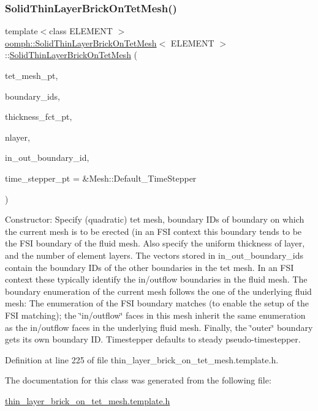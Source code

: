 \subsubsection{\texorpdfstring{Solid\+Thin\+Layer\+Brick\+On\+Tet\+Mesh()}{SolidThinLayerBrickOnTetMesh()}}
{\footnotesize\ttfamily template$<$class E\+L\+E\+M\+E\+NT $>$ \\
\hyperlink{classoomph_1_1SolidThinLayerBrickOnTetMesh}{oomph\+::\+Solid\+Thin\+Layer\+Brick\+On\+Tet\+Mesh}$<$ E\+L\+E\+M\+E\+NT $>$\+::\hyperlink{classoomph_1_1SolidThinLayerBrickOnTetMesh}{Solid\+Thin\+Layer\+Brick\+On\+Tet\+Mesh} (\begin{DoxyParamCaption}\item[{Mesh $\ast$}]{tet\+\_\+mesh\+\_\+pt,  }\item[{const Vector$<$ unsigned $>$ \&}]{boundary\+\_\+ids,  }\item[{\hyperlink{classoomph_1_1SolidThinLayerBrickOnTetMesh_ae4289650b0c0eccb2fd3d661b85e85ee}{Thickness\+Fct\+Pt}}]{thickness\+\_\+fct\+\_\+pt,  }\item[{const unsigned \&}]{nlayer,  }\item[{const Vector$<$ Vector$<$ unsigned $>$ $>$ \&}]{in\+\_\+out\+\_\+boundary\+\_\+id,  }\item[{Time\+Stepper $\ast$}]{time\+\_\+stepper\+\_\+pt = {\ttfamily \&Mesh\+:\+:Default\+\_\+TimeStepper} }\end{DoxyParamCaption})\hspace{0.3cm}{\ttfamily [inline]}}



Constructor\+: Specify (quadratic) tet mesh, boundary I\+Ds of boundary on which the current mesh is to be erected (in an F\+SI context this boundary tends to be the F\+SI boundary of the fluid mesh. Also specify the uniform thickness of layer, and the number of element layers. The vectors stored in in\+\_\+out\+\_\+boundary\+\_\+ids contain the boundary I\+Ds of the other boundaries in the tet mesh. In an F\+SI context these typically identify the in/outflow boundaries in the fluid mesh. The boundary enumeration of the current mesh follows the one of the underlying fluid mesh\+: The enumeration of the F\+SI boundary matches (to enable the setup of the F\+SI matching); the \char`\"{}in/outflow\char`\"{} faces in this mesh inherit the same enumeration as the in/outflow faces in the underlying fluid mesh. Finally, the \char`\"{}outer\char`\"{} boundary gets its own boundary ID. Timestepper defaults to steady pseudo-\/timestepper. 



Definition at line 225 of file thin\+\_\+layer\+\_\+brick\+\_\+on\+\_\+tet\+\_\+mesh.\+template.\+h.



The documentation for this class was generated from the following file\+:\begin{DoxyCompactItemize}
\item 
\hyperlink{thin__layer__brick__on__tet__mesh_8template_8h}{thin\+\_\+layer\+\_\+brick\+\_\+on\+\_\+tet\+\_\+mesh.\+template.\+h}\end{DoxyCompactItemize}
